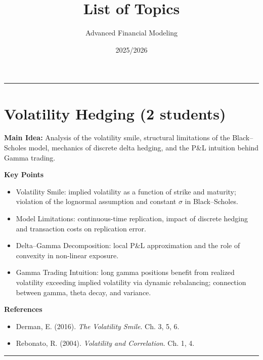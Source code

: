 \documentclass[12pt,a4paper]{article}
\title{\textbf{List of Topics}}
\author{Advanced Financial Modeling}
\date{2025/2026}
\begin{document}
\maketitle
\thispagestyle{empty}
\vspace{1cm}

\hrule
\vspace{0.5cm}


\section{Volatility Hedging (2 students)}

\textbf{Main Idea:}  
Analysis of the volatility smile, structural limitations of the Black--Scholes model, mechanics of discrete delta hedging, and the P\&L intuition behind Gamma trading.

\medskip
\textbf{Key Points}
\begin{itemize}
    \item Volatility Smile: implied volatility as a function of strike and maturity; violation of the lognormal assumption and constant $\sigma$ in Black--Scholes.
    
    \item Model Limitations: continuous-time replication, impact of discrete hedging and transaction costs on replication error.
    
    \item Delta–Gamma Decomposition: local P\&L approximation    and the role of convexity in non-linear exposure.
    
    \item Gamma Trading Intuition: long gamma positions benefit from realized volatility exceeding implied volatility via dynamic rebalancing; connection between gamma, theta decay, and variance.
\end{itemize}

\medskip
\textbf{References}
\begin{itemize}
    \item[-] Derman, E. (2016). \textit{The Volatility Smile}. Ch. 3, 5, 6.
    \item[-] Rebonato, R. (2004). \textit{Volatility and Correlation}. Ch. 1, 4.
\end{itemize}

\vspace{0.5cm}
\hrule
\vspace{0.5cm}

\end{document}
